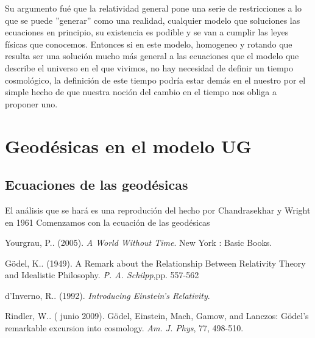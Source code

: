 \documentclass[11pt]{book}
\begin{document}
Su argumento fué que la relatividad general pone una serie de restricciones a lo que se puede ''generar'' como una realidad, cualquier modelo que soluciones las ecuaciones en principio, su existencia es podible y se van a cumplir las leyes físicas que conocemos. Entonces si en este modelo, homogeneo y rotando que resulta ser una solución mucho más general a las ecuaciones que el modelo que describe el universo en el que vivimos, no hay necesidad de definir un tiempo cosmológico, la definición de este tiempo podría estar demás en el nuestro por el simple hecho de que nuestra noción del cambio en el tiempo nos obliga a proponer uno.

\chapter{Geodésicas en el modelo UG}

\section{Ecuaciones de las geodésicas}

El análisis que se hará es una reprodución del hecho por Chandrasekhar y Wright en 1961 %
Comenzamos con la ecuación de las geodésicas 









 \begin{thebibliography}{99}
  Yourgrau, P.. (2005). \emph{A World Without Time}. New York %
 : Basic Books.
 
  Gödel, K.. (1949). A Remark about the Relationship Between Relativity Theory and Idealistic Philosophy. \emph{P. A. Schilpp},pp. 557-562
 
  d'Inverno, R.. (1992). \emph{Introducing Einstein's Relativity}. 
 
  Rindler, W.. ( junio 2009). Gödel, Einstein, Mach, Gamow, and Lanczos: Gödel’s remarkable excursion into cosmology. \emph{Am. J. Phys}, 77, 498-510.
 
 
 \end{thebibliography}
 
\end{document}
